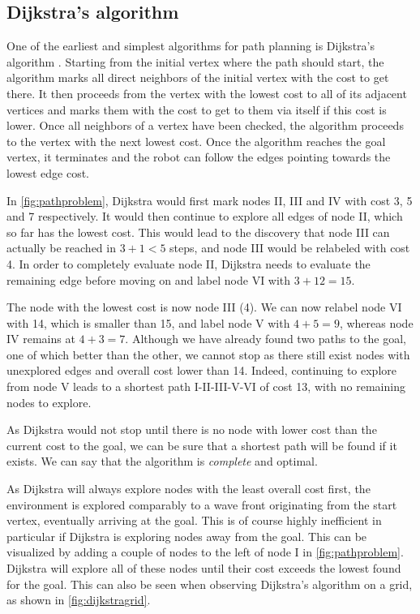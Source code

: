 \subsection{Dijkstra's algorithm}

One of the earliest and simplest algorithms for path planning is Dijkstra's algorithm \cite{dijkstra1959note}. Starting from the initial vertex where the path should start, the algorithm marks all direct neighbors of the initial vertex with the cost to get there. It then proceeds from the vertex with the lowest cost to all of its adjacent vertices and marks them with the cost to get to them via itself if this cost is lower. Once all neighbors of a vertex have been checked, the algorithm proceeds to the vertex with the next lowest cost. Once the algorithm reaches the goal vertex, it terminates and the robot can follow the edges pointing towards the lowest edge cost.

In \cref{fig:pathproblem}, Dijkstra would first mark nodes II, III and IV with cost 3, 5 and 7 respectively. It would then continue to explore all edges of node II, which so far has the lowest cost. This would lead to the discovery that node III can actually be reached in $3+1<5$ steps, and node III would be relabeled with cost 4. In order to completely evaluate node II, Dijkstra needs to evaluate the remaining edge before moving on and label node VI with $3+12=15$.

The node with the lowest cost is now node III (4). We can now relabel node VI with 14, which is smaller than 15, and label node V with $4+5=9$, whereas node IV remains at $4+3=7$. Although we have already found two paths to the goal, one of which better than the other, we cannot stop as there still exist nodes with unexplored edges and overall cost lower than 14. Indeed, continuing to explore from node V leads to a shortest path I-II-III-V-VI of cost 13, with no remaining nodes to explore.

As Dijkstra would not stop until there is no node with lower cost than the current cost to the goal, we can be sure that a shortest path will be found if it exists. We can say that the algorithm is \textsl{complete} and optimal.

As Dijkstra will always explore nodes with the least overall cost first, the environment is explored comparably to a wave front originating from the start vertex, eventually arriving at the goal. This is of course highly inefficient in particular if Dijkstra is exploring nodes away from the goal. This can be visualized by adding a couple of nodes to the left of node I in \cref{fig:pathproblem}. Dijkstra will explore all of these nodes until their cost exceeds the lowest found for the goal. This can also be seen when observing Dijkstra's algorithm on a grid, as shown in \cref{fig:dijkstragrid}.

